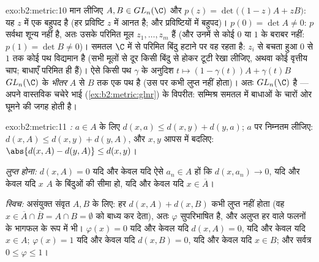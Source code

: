 \begin{solution}{exo:b2:metric:10}
मान लीजिए $A, B \in GL_n(\C)$ और $p(z) = \det\bigl((1-z)A + zB\bigr)$: यह $z$ में एक बहुपद है (हर प्रविष्टि $z$ में
आनत है; और  प्रविष्टियों में बहुपद)। $p(0) = \det A \neq 0$: $p$ सर्वथा शून्य नहीं
है, अतः उसके परिमित मूल $z_1, \dots, z_m$ हैं (और उनमें से कोई $0$ या $1$ के बराबर
नहीं: $p(1) = \det B \neq 0$)। समतल $\C$ में से परिमित बिंदु हटाने पर वह  रहता
है: $z_i$ से बचता हुआ $0$ से $1$ तक कोई पथ विद्यमान है (सभी मूलों से
दूर किसी बिंदु से होकर टूटी रेखा लीजिए, अथवा कोई वृत्तीय चाप; बाधाएँ
परिमित ही हैं)। ऐसे किसी पथ $\gamma$ के अनुदिश $t \mapsto (1 - \gamma(t))A +
\gamma(t)B$ $GL_n(\C)$ के \emph{भीतर}
$A$ से $B$ तक एक  पथ है (उस पर  कभी लुप्त नहीं होता)। अतः
$GL_n(\C)$  है --- अपने वास्तविक चचेरे भाई (\cref{ex:b2:metric:glnr}) के विपरीत: सम्मिश्र
समतल में बाधाओं के चारों ओर घूमने की जगह होती है।
\end{solution}

\begin{solution}{exo:b2:metric:11}
\emph{:} $a \in A$ के लिए $d(x, a) \leq d(x, y) + d(y,
a)$; $a$ पर निम्नतम लीजिए: $d(x, A) \leq d(x, y) + d(y,
A)$, और $x, y$
आपस में बदलिए: $\abs{d(x,A) - d(y,A)} \leq d(x,y)$।

\emph{लुप्त होना:} $d(x, A) = 0$ यदि और केवल यदि ऐसे $a_n \in A$ हों कि $d(x, a_n) \to 0$, यदि और केवल
यदि $x$ $A$ के बिंदुओं की सीमा हो, यदि और केवल यदि $x \in
\overline A$।

\emph{स्विच:} असंयुक्त संवृत $A, B$ के लिए: हर $d(x,A) + d(x,B)$ कभी लुप्त नहीं होता (वह
$x \in \overline
A \cap \overline B = A \cap B = \emptyset$ को बाध्य कर देता), अतः $\varphi$ सुपरिभाषित है, और अलुप्त हर वाले 
फलनों के भागफल के रूप में  भी। $\varphi(x) = 0$ यदि और केवल यदि $d(x, A) = 0$, यदि और केवल
यदि $x \in A$; $\varphi(x) = 1$ यदि और केवल यदि $d(x, B) = 0$, यदि और केवल यदि $x \in B$; और सर्वत्र $0 \leq \varphi \leq 1$।
\end{solution}

